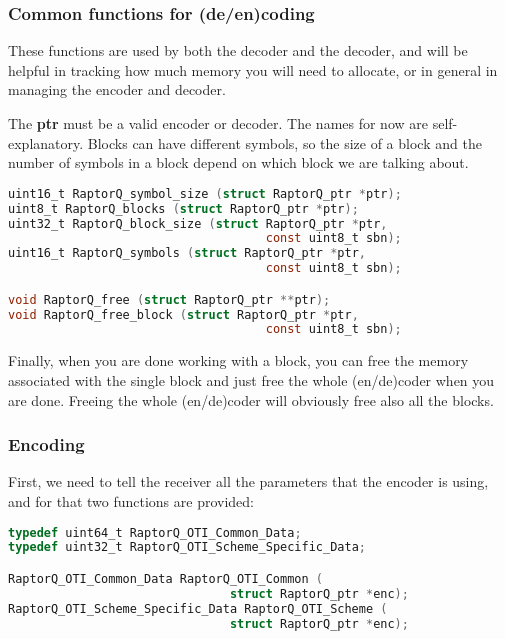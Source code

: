 \documentclass[11pt,a4paper]{refart}
\begin{document}
\newpage

\subsubsection{Common functions for (de/en)coding}

These functions are used by both the decoder and the decoder, and will be helpful in tracking how much memory
you will need to allocate, or in general in managing the encoder and decoder.

The \textbf{ptr} must be a valid encoder or decoder.
The names for now are self-explanatory. Blocks can have different symbols, so the size of a block and the number of symbols in a block
depend on which block we are talking about.

\begin{lstlisting}[language=C]
uint16_t RaptorQ_symbol_size (struct RaptorQ_ptr *ptr);
uint8_t RaptorQ_blocks (struct RaptorQ_ptr *ptr);
uint32_t RaptorQ_block_size (struct RaptorQ_ptr *ptr,
                                    const uint8_t sbn);
uint16_t RaptorQ_symbols (struct RaptorQ_ptr *ptr,
                                    const uint8_t sbn);

void RaptorQ_free (struct RaptorQ_ptr **ptr);
void RaptorQ_free_block (struct RaptorQ_ptr *ptr,
                                    const uint8_t sbn);
\end{lstlisting}
Finally, when you are done working with a block, you can free the memory associated with the single block
and just free the whole (en/de)coder when you are done. Freeing the whole (en/de)coder will obviously free
also all the blocks.


\newpage
\subsubsection{Encoding}

First, we need to tell the receiver all the parameters that the encoder is using, and for that two functions are provided:

\begin{lstlisting}[language=C]
typedef uint64_t RaptorQ_OTI_Common_Data;
typedef uint32_t RaptorQ_OTI_Scheme_Specific_Data;

RaptorQ_OTI_Common_Data RaptorQ_OTI_Common (
                               struct RaptorQ_ptr *enc);
RaptorQ_OTI_Scheme_Specific_Data RaptorQ_OTI_Scheme (
                               struct RaptorQ_ptr *enc);
\end{lstlisting}
\end{document}
